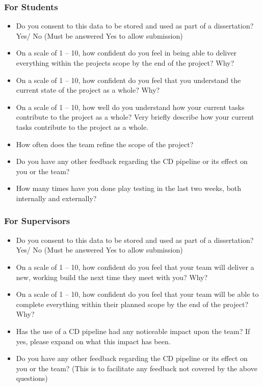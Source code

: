 \documentclass{article}
\begin{document}
        \newpage

        \subsubsection*{For Students}
        \begin{itemize}
            \item Do you consent to this data to be stored and used as part of a dissertation? Yes/ No (Must be answered Yes to allow submission)
            \item On a scale of 1 – 10, how confident do you feel in being able to deliver everything within the projects scope by the end of the project? Why?
            \item On a scale of 1 – 10, how confident do you feel that you understand the current state of the project as a whole? Why?
            \item On a scale of 1 – 10, how well do you understand how your current tasks contribute to the project as a whole? Very briefly describe how your current tasks contribute to the project as a whole.
            \item How often does the team refine the scope of the project?
            \item Do you have any other feedback regarding the CD pipeline or its effect on you or the team?
            \item How many times have you done play testing in the last two weeks, both internally and externally?
        \end{itemize}

        \subsubsection*{For Supervisors}
        \begin{itemize}
            \item Do you consent to this data to be stored and used as part of a dissertation? Yes/ No (Must be answered Yes to allow submission)
            \item On a scale of 1 – 10, how confident do you feel that your team will deliver a new, working build the next time they meet with you? Why?
            \item On a scale of 1 – 10, how confident do you feel that your team will be able to complete everything within their planned scope by the end of the project? Why?
            \item Has the use of a CD pipeline had any noticeable impact upon the team? If yes, please expand on what this impact has been.
            \item Do you have any other feedback regarding the CD pipeline or its effect on you or the team? (This is to facilitate any feedback not covered by the above questions)
        \end{itemize}
        
\end{document}
